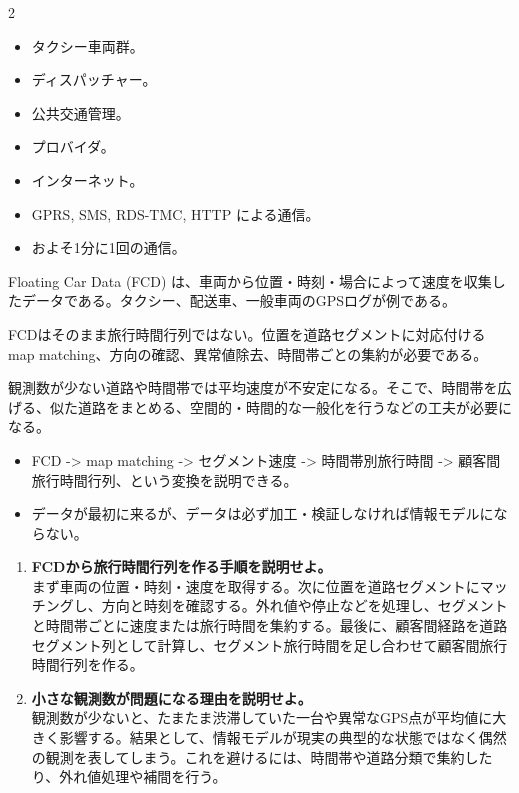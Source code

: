 \clearpage
{}
\begin{multicols}{2}\footnotesize\raggedcolumns
{}
\begin{itemize}
\item タクシー車両群。
\item ディスパッチャー。
\item 公共交通管理。
\item プロバイダ。
\item インターネット。
\item GPRS, SMS, RDS-TMC, HTTP による通信。
\item およそ1分に1回の通信。
\end{itemize}
Floating Car Data (FCD) は、車両から位置・時刻・場合によって速度を収集したデータである。タクシー、配送車、一般車両のGPSログが例である。\par

FCDはそのまま旅行時間行列ではない。位置を道路セグメントに対応付ける map matching、方向の確認、異常値除去、時間帯ごとの集約が必要である。\par

観測数が少ない道路や時間帯では平均速度が不安定になる。そこで、時間帯を広げる、似た道路をまとめる、空間的・時間的な一般化を行うなどの工夫が必要になる。\par
{}
\begin{itemize}
\item FCD -> map matching -> セグメント速度 -> 時間帯別旅行時間 -> 顧客間旅行時間行列、という変換を説明できる。
\item データが最初に来るが、データは必ず加工・検証しなければ情報モデルにならない。
\end{itemize}
\begin{enumerate}
\item \textbf{FCDから旅行時間行列を作る手順を説明せよ。}\\まず車両の位置・時刻・速度を取得する。次に位置を道路セグメントにマッチングし、方向と時刻を確認する。外れ値や停止などを処理し、セグメントと時間帯ごとに速度または旅行時間を集約する。最後に、顧客間経路を道路セグメント列として計算し、セグメント旅行時間を足し合わせて顧客間旅行時間行列を作る。
\item \textbf{小さな観測数が問題になる理由を説明せよ。}\\観測数が少ないと、たまたま渋滞していた一台や異常なGPS点が平均値に大きく影響する。結果として、情報モデルが現実の典型的な状態ではなく偶然の観測を表してしまう。これを避けるには、時間帯や道路分類で集約したり、外れ値処理や補間を行う。
\end{enumerate}
\end{multicols}

